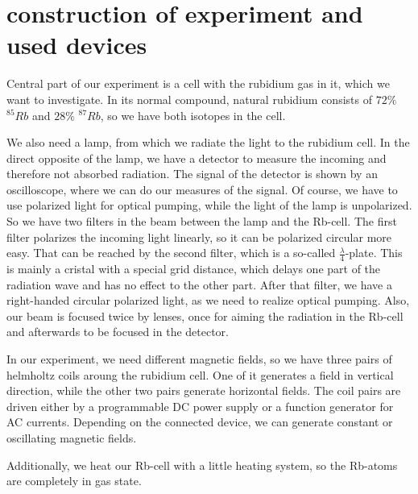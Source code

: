 \section{construction of experiment and used devices}
Central part of our experiment is a cell with the rubidium gas in it, which we want to investigate. In its normal compound, natural rubidium consists of $72\%$ $^{85}Rb$ and $28\%$ $ ^{87}Rb$, so we have both isotopes in the cell.

We also need a lamp, from which we radiate the light to the rubidium cell. In the direct opposite of the lamp, we have a detector to measure the incoming and therefore not absorbed radiation. The signal of the detector is shown by an oscilloscope, where we can do our measures of the signal. Of course, we have to use polarized light for optical pumping, while the light of the lamp is unpolarized. So we have two filters in the beam between the lamp and the Rb-cell. The first filter polarizes the incoming light linearly, so it can be polarized circular more easy. That can be reached by the second filter, which is a so-called $\frac{\lambda}{4}$-plate. This is mainly a cristal with a special grid distance, which delays one part of the radiation wave and has no effect to the other part. After that filter, we have a right-handed circular polarized light, as we need to realize optical pumping. Also, our beam is focused twice by lenses, once for aiming the radiation in the Rb-cell and afterwards to be focused in the detector. 

In our experiment, we need different magnetic fields, so we have three pairs of helmholtz coils aroung the rubidium cell. One of it generates a field in vertical direction, while the other two pairs generate horizontal fields. The coil pairs are driven  either by a programmable DC power supply or a function generator for AC currents. Depending on the connected device, we can generate constant or oscillating magnetic fields. 

Additionally, we heat our Rb-cell with a little heating system, so the Rb-atoms are completely in gas state. 

